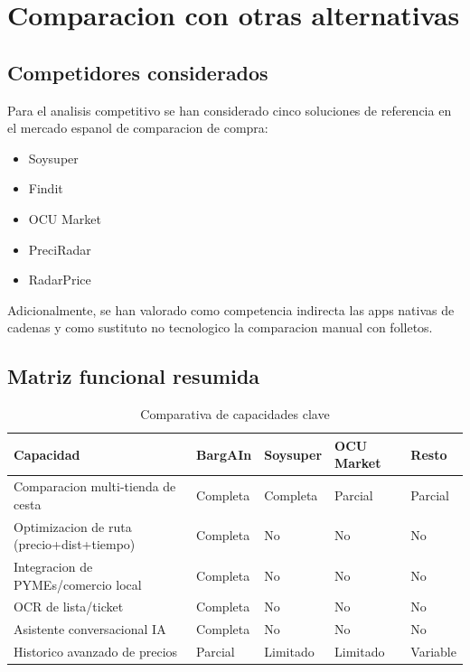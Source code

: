 \chapter{Comparacion con otras alternativas}\label{alternativas}

\section{Competidores considerados}

Para el analisis competitivo se han considerado cinco soluciones de referencia en el
mercado espanol de comparacion de compra:

\begin{itemize}
	\item Soysuper
	\item Findit
	\item OCU Market
	\item PreciRadar
	\item RadarPrice
\end{itemize}

Adicionalmente, se han valorado como competencia indirecta las apps nativas de cadenas
y como sustituto no tecnologico la comparacion manual con folletos.

\section{Matriz funcional resumida}

\begin{table}[h]
\centering
\caption{Comparativa de capacidades clave}
\label{tab:comparativa-alternativas}
\begin{tabular}{|p{3.4cm}|p{1.9cm}|p{1.8cm}|p{1.8cm}|p{1.9cm}|}
\hline
\textbf{Capacidad} & \textbf{BargAIn} & \textbf{Soysuper} & \textbf{OCU Market} & \textbf{Resto} \\
\hline
Comparacion multi-tienda de cesta & Completa & Completa & Parcial & Parcial \\
\hline
Optimizacion de ruta (precio+dist+tiempo) & Completa & No & No & No \\
\hline
Integracion de PYMEs/comercio local & Completa & No & No & No \\
\hline
OCR de lista/ticket & Completa & No & No & No \\
\hline
Asistente conversacional IA & Completa & No & No & No \\
\hline
Historico avanzado de precios & Parcial & Limitado & Limitado & Variable \\
\hline
\end{tabular}
\end{table}


